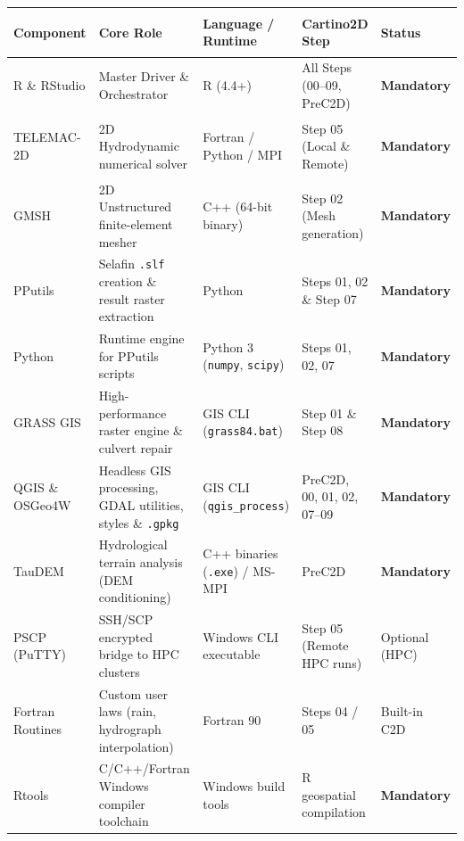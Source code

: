 \documentclass[10pt,a4paper]{article}
\begin{document}
\noindent
\begin{tabularx}{\textwidth}{>{\bfseries\raggedright\arraybackslash}p{2.6cm} X >{\raggedright\arraybackslash}p{3.2cm} >{\raggedright\arraybackslash}p{2.5cm} >{\centering\arraybackslash}p{2.1cm}}
\toprule
\rowcolor{headergray}
\color{navyblue}Component & \color{navyblue}Core Role & \color{navyblue}Language / Runtime & \color{navyblue}Cartino2D Step & \color{navyblue}Status \\
\midrule
R \& RStudio & Master Driver \& Orchestrator & R (4.4+) & All Steps (00--09, PreC2D) & \textbf{\color{mandatoryred}Mandatory} \\
\addlinespace[3pt]
TELEMAC-2D & 2D Hydrodynamic numerical solver & Fortran / Python / MPI & Step 05 (Local \& Remote) & \textbf{\color{mandatoryred}Mandatory} \\
\addlinespace[3pt]
GMSH & 2D Unstructured finite-element mesher & C++ (64-bit binary) & Step 02 (Mesh generation) & \textbf{\color{mandatoryred}Mandatory} \\
\addlinespace[3pt]
PPutils & Selafin \texttt{.slf} creation \& result raster extraction & Python & Steps 01, 02 \& Step 07 & \textbf{\color{mandatoryred}Mandatory} \\
\addlinespace[3pt]
Python & Runtime engine for PPutils scripts & Python 3 (\texttt{numpy}, \texttt{scipy}) & Steps 01, 02, 07 & \textbf{\color{mandatoryred}Mandatory} \\
\addlinespace[3pt]
GRASS GIS & High-performance raster engine \& culvert repair & GIS CLI (\texttt{grass84.bat}) & Step 01 \& Step 08 & \textbf{\color{mandatoryred}Mandatory} \\
\addlinespace[3pt]
QGIS \& OSGeo4W & Headless GIS processing, GDAL utilities, styles \& \texttt{.gpkg} & GIS CLI (\texttt{qgis\_process}) & PreC2D, 00, 01, 02, 07--09 & \textbf{\color{mandatoryred}Mandatory} \\
\addlinespace[3pt]
TauDEM & Hydrological terrain analysis (DEM conditioning) & C++ binaries (\texttt{.exe}) / MS-MPI & PreC2D & \textbf{\color{mandatoryred}Mandatory} \\
\addlinespace[3pt]
PSCP (PuTTY) & SSH/SCP encrypted bridge to HPC clusters & Windows CLI executable & Step 05 (Remote HPC runs) & \color{optionalgray}Optional (HPC) \\
\addlinespace[3pt]
Fortran Routines & Custom user laws (rain, hydrograph interpolation) & Fortran 90 & Steps 04 / 05 & Built-in C2D \\
\addlinespace[3pt]
Rtools & C/C++/Fortran Windows compiler toolchain & Windows build tools & R geospatial compilation & \textbf{\color{mandatoryred}Mandatory} \\
\bottomrule
\end{tabularx}
\end{document}

